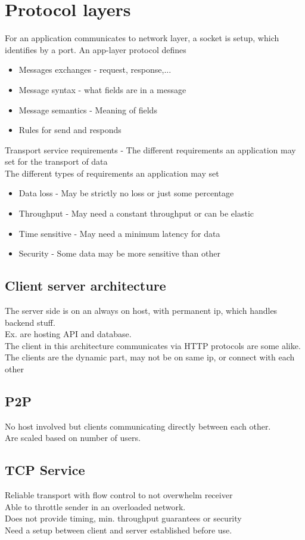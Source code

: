 \documentclass[12pt, a4paper]{article}
\begin{document}
	\section{Protocol layers}
		For an application communicates to network layer, a socket is setup, which identifies by a port.
		An app-layer protocol defines
		\begin{itemize}
			\item Messages exchanges - request, response,...
			\item Message syntax - what fields are in a message
			\item Message semantics - Meaning of fields
			\item Rules for send and responds
		\end{itemize}
		Transport service requirements - The different requirements an application may set for the transport of data\\
		The different types of requirements an application may set
		\begin{itemize}
			\item Data loss - May be strictly no loss or just some percentage
			\item Throughput - May need a constant throughput or can be elastic 
			\item Time sensitive - May need a minimum latency for data
			\item Security - Some data may be more sensitive than other
		\end{itemize}
		\subsection{Client server architecture}
			The server side is on an always on host, with permanent ip, which handles backend stuff. \\
			Ex. are hosting API and database.\\
			The client in this architecture communicates via HTTP protocols are some alike.\\
			The clients are the dynamic part, may not be on same ip, or connect with each other\\
		\subsection{P2P}
			No host involved but clients communicating directly between each other.\\
			Are scaled based on number of users.
		\subsection{TCP Service}
			Reliable transport with flow control to not overwhelm receiver\\
			Able to throttle sender in an overloaded network.\\
			Does not provide timing, min. throughput guarantees or security\\
			Need a setup between client and server established before use.
\end{document}
